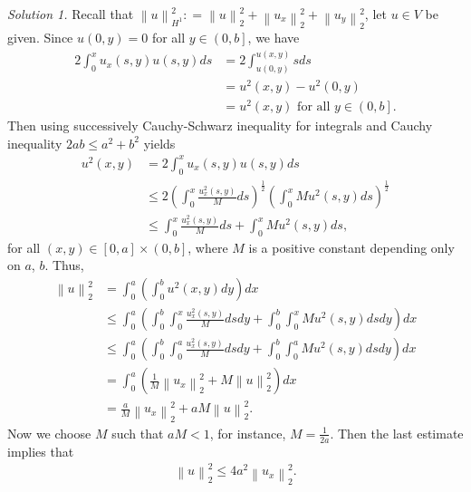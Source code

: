 \documentclass[11pt,a4paper]{article}
\numberwithin{equation}{section}
\numberwithin{equation}{section}
\begin{document}
\begin{enumerate}
\textit{Solution 1.} Recall that $\left\| u \right\|_{{H^1}}^2: = \left\| u \right\|_2^2 + \left\| {{u_x}} \right\|_2^2 + \left\| {{u_y}} \right\|_2^2$, let $u\in V$ be given. Since $u\left(0,y\right)=0$ for all $y\in \left(0,b\right]$, we have
\begin{align}
2\int_0^x {{u_x}\left( {s,y} \right)u\left( {s,y} \right)ds}  &= 2\int_{u\left( {0,y} \right)}^{u\left( {x,y} \right)} {sds} \\
& = {u^2}\left( {x,y} \right) - {u^2}\left( {0,y} \right)\\
& = {u^2}\left( {x,y} \right) \mbox{ for all } y \in \left( {0,b} \right].
\end{align}
Then using successively Cauchy-Schwarz inequality for integrals and Cauchy inequality $2ab\le a^2+b^2$ yields
\begin{align}
{u^2}\left( {x,y} \right) &= 2\int_0^x {{u_x}\left( {s,y} \right)u\left( {s,y} \right)ds} \\
& \le 2{\left( {\int_0^x {\frac{{u_x^2\left( {s,y} \right)}}{M}ds} } \right)^{\frac{1}{2}}}{\left( {\int_0^x {M{u^2}\left( {s,y} \right)ds} } \right)^{\frac{1}{2}}} \\
& \le \int_0^x {\frac{{u_x^2\left( {s,y} \right)}}{M}ds}  + \int_0^x {M{u^2}\left( {s,y} \right)ds} ,
\end{align}
for all $\left(x,y\right)\in \left[0,a\right]\times \left(0,b\right]$, where $M$ is a positive constant depending only on $a$, $b$. Thus,
\begin{align}
\left\| u \right\|_2^2 &= \int_0^a {\left( {\int_0^b {{u^2}\left( {x,y} \right)dy} } \right)dx} \\
& \le \int_0^a {\left( {\int_0^b {\int_0^x {\frac{{u_x^2\left( {s,y} \right)}}{M}ds} dy}  + \int_0^b {\int_0^x {M{u^2}\left( {s,y} \right)ds} dy} } \right)dx} \\
& \le \int_0^a {\left( {\int_0^b {\int_0^a {\frac{{u_x^2\left( {s,y} \right)}}{M}ds} dy}  + \int_0^b {\int_0^a {M{u^2}\left( {s,y} \right)ds} dy} } \right)dx} \\
& = \int_0^a {\left( {\frac{1}{M}\left\| {{u_x}} \right\|_2^2 + M\left\| u \right\|_2^2} \right)dx} \\
& = \frac{a}{M}\left\| {{u_x}} \right\|_2^2 + aM\left\| u \right\|_2^2.
\end{align}
Now we choose $M$ such that $aM<1$, for instance, $M=\frac{1}{2a}$. Then the last estimate implies that 
\begin{align}
\label{1.30}
\left\| u \right\|_2^2 \le 4{a^2}\left\| {{u_x}} \right\|_2^2.
\end{align}

\end{enumerate}
\end{document}
